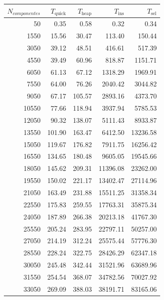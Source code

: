 \documentclass{homework}
\begin{document}
    \begin{table}[H]
        \footnotesize
        \centering
        \begin{tabular}{|r|r|r|r|r|}
            \hline
            $N_{componentes}$ & $T_{\text{quick}}$ & $T_{\text{heap}}$ & $T_{\text{ins}}$ & $T_{\text{sel}}$ \\
            \hline
            50 & 0.35 & 0.58 & 0.32 & 0.34 \\ 
            1550 & 15.56 & 30.47 & 113.40 & 150.44 \\ 
            3050 & 39.12 & 48.51 & 416.61 & 517.39 \\ 
            4550 & 39.49 & 60.96 & 818.87 & 1151.71 \\ 
            6050 & 61.13 & 67.12 & 1318.29 & 1969.91 \\ 
            7550 & 64.00 & 76.26 & 2040.42 & 3044.82 \\ 
            9050 & 67.17 & 105.57 & 2893.16 & 4373.70 \\ 
            10550 & 77.66 & 118.94 & 3937.94 & 5785.53 \\ 
            12050 & 90.32 & 138.07 & 5111.43 & 8933.87 \\ 
            13550 & 101.90 & 163.47 & 6412.50 & 13236.58 \\ 
            15050 & 119.67 & 176.82 & 7911.75 & 16256.42 \\ 
            16550 & 134.65 & 180.48 & 9605.05 & 19545.66 \\ 
            18050 & 145.62 & 209.31 & 11396.08 & 23262.00 \\ 
            19550 & 150.02 & 221.17 & 13402.47 & 27114.96 \\ 
            21050 & 163.49 & 231.88 & 15511.25 & 31358.34 \\ 
            22550 & 175.83 & 259.55 & 17763.31 & 35875.34 \\ 
            24050 & 187.89 & 266.38 & 20213.18 & 41767.30 \\ 
            25550 & 205.24 & 283.95 & 22797.11 & 50257.00 \\ 
            27050 & 214.19 & 312.24 & 25575.44 & 57776.30 \\ 
            28550 & 228.24 & 322.75 & 28426.29 & 62347.18 \\ 
            30050 & 245.48 & 342.44 & 31521.96 & 63689.96 \\ 
            31550 & 254.54 & 368.07 & 34782.56 & 70027.92 \\ 
            33050 & 269.09 & 388.03 & 38191.71 & 83165.06 \\ 

\end{tabular}
\end{table}
\end{document}
